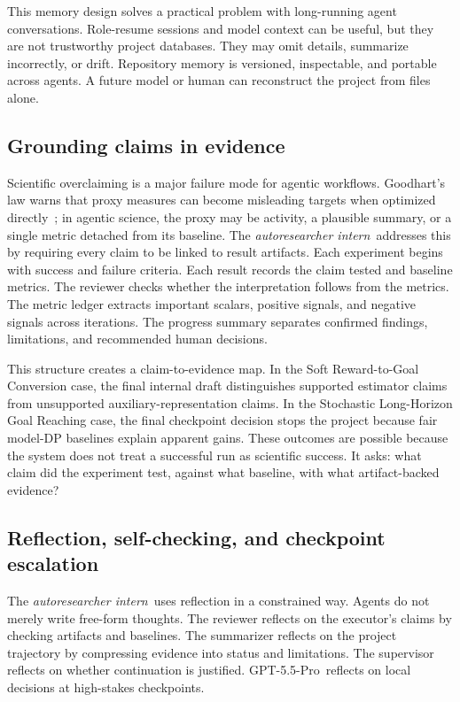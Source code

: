 \documentclass{article}
\newcommand{\intern}{\emph{autoresearcher intern}}
\newcommand{\gptpro}{GPT-5.5-Pro}
\begin{document}
This memory design solves a practical problem with long-running agent conversations. Role-resume sessions and model context can be useful, but they are not trustworthy project databases. They may omit details, summarize incorrectly, or drift. Repository memory is versioned, inspectable, and portable across agents. A future model or human can reconstruct the project from files alone.

\subsection{Grounding claims in evidence}

Scientific overclaiming is a major failure mode for agentic workflows. Goodhart's law warns that proxy measures can become misleading targets when optimized directly~\citep{goodhart1975problems}; in agentic science, the proxy may be activity, a plausible summary, or a single metric detached from its baseline. The \intern\ addresses this by requiring every claim to be linked to result artifacts. Each experiment begins with success and failure criteria. Each result records the claim tested and baseline metrics. The reviewer checks whether the interpretation follows from the metrics. The metric ledger extracts important scalars, positive signals, and negative signals across iterations. The progress summary separates confirmed findings, limitations, and recommended human decisions.

This structure creates a claim-to-evidence map. In the Soft Reward-to-Goal Conversion case, the final internal draft distinguishes supported estimator claims from unsupported auxiliary-representation claims. In the Stochastic Long-Horizon Goal Reaching case, the final checkpoint decision stops the project because fair model-DP baselines explain apparent gains. These outcomes are possible because the system does not treat a successful run as scientific success. It asks: what claim did the experiment test, against what baseline, with what artifact-backed evidence?

\subsection{Reflection, self-checking, and checkpoint escalation}

The \intern\ uses reflection in a constrained way. Agents do not merely write free-form thoughts. The reviewer reflects on the executor's claims by checking artifacts and baselines. The summarizer reflects on the project trajectory by compressing evidence into status and limitations. The supervisor reflects on whether continuation is justified. \gptpro\ reflects on local decisions at high-stakes checkpoints.
\end{document}
